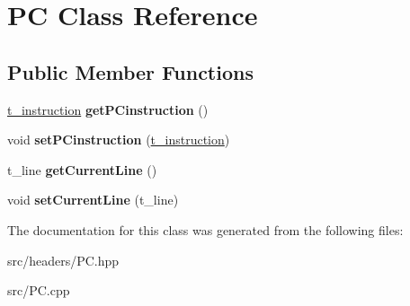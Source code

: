 \hypertarget{classPC}{\section{P\-C Class Reference}
\label{classPC}
}
\subsection*{Public Member Functions}
\begin{DoxyCompactItemize}
\item 
\hypertarget{classPC_a4e974c3154857ffeab9112b99345ad60}{\hyperlink{classInstruction}{t\-\_\-instruction} {\bfseries get\-P\-Cinstruction} ()}\label{classPC_a4e974c3154857ffeab9112b99345ad60}

\item 
\hypertarget{classPC_a85d34e54abd197248883940c04d5570d}{void {\bfseries set\-P\-Cinstruction} (\hyperlink{classInstruction}{t\-\_\-instruction})}\label{classPC_a85d34e54abd197248883940c04d5570d}

\item 
\hypertarget{classPC_a3eb80177254d0cd8d4fd8c8ef68adaff}{t\-\_\-line {\bfseries get\-Current\-Line} ()}\label{classPC_a3eb80177254d0cd8d4fd8c8ef68adaff}

\item 
\hypertarget{classPC_a451dc96b1029b99e17797bb33529027b}{void {\bfseries set\-Current\-Line} (t\-\_\-line)}\label{classPC_a451dc96b1029b99e17797bb33529027b}

\end{DoxyCompactItemize}


The documentation for this class was generated from the following files\-:\begin{DoxyCompactItemize}
\item 
src/headers/P\-C.\-hpp\item 
src/P\-C.\-cpp\end{DoxyCompactItemize}
